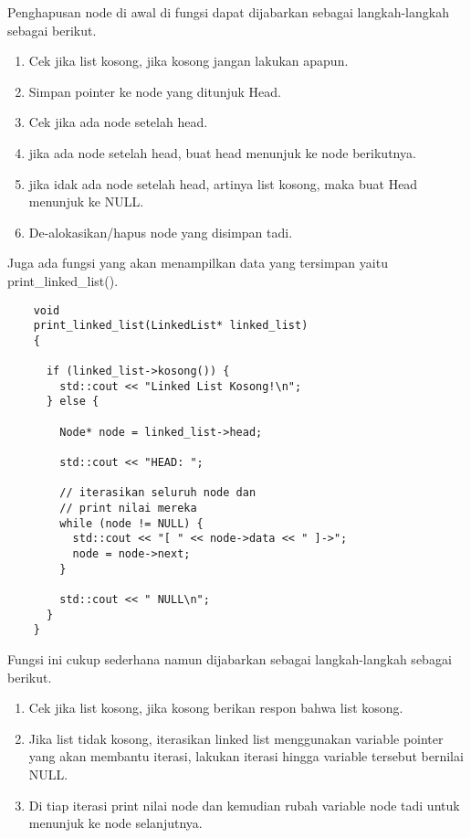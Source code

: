 \documentclass[12pt, a4paper]{article}
\begin{document}
  Penghapusan node di awal di fungsi dapat dijabarkan sebagai langkah-langkah
  sebagai berikut.

  \begin{enumerate}
    \item Cek jika list kosong, jika kosong jangan lakukan apapun.
    \item Simpan pointer ke node yang ditunjuk Head.
    \item Cek jika ada node setelah head.
    \item jika ada node setelah head, buat head menunjuk ke node berikutnya.
    \item jika idak ada node setelah head, artinya list kosong, maka buat Head menunjuk ke NULL.
    \item De-alokasikan/hapus node yang disimpan tadi.
  \end{enumerate}

  Juga ada fungsi yang akan menampilkan data yang tersimpan yaitu print\_linked\_list().

  \vspace{0.5cm}
  \begin{lstlisting}
    void
    print_linked_list(LinkedList* linked_list)
    {

      if (linked_list->kosong()) {
        std::cout << "Linked List Kosong!\n";
      } else {

        Node* node = linked_list->head;

        std::cout << "HEAD: ";

        // iterasikan seluruh node dan
        // print nilai mereka
        while (node != NULL) {
          std::cout << "[ " << node->data << " ]->";
          node = node->next;
        }

        std::cout << " NULL\n";
      }
    }
  \end{lstlisting}
  \vspace{0.5cm}

  Fungsi ini cukup sederhana namun dijabarkan sebagai langkah-langkah
  sebagai berikut.

  \begin{enumerate}
    \item Cek jika list kosong, jika kosong berikan respon bahwa list kosong.
    \item Jika list tidak kosong, iterasikan linked list menggunakan variable
      pointer yang akan membantu iterasi, lakukan iterasi hingga variable tersebut bernilai NULL.
    \item Di tiap iterasi print nilai node dan kemudian rubah variable
      node tadi untuk menunjuk ke node selanjutnya.
  \end{enumerate}
\end{document}
